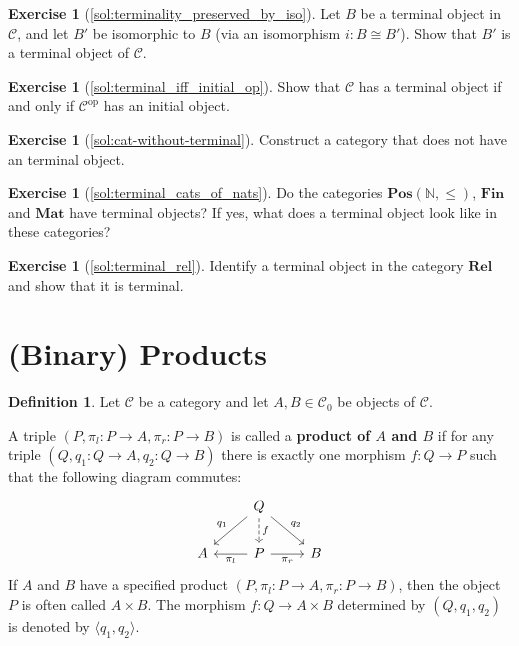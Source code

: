 \documentclass[a4paper,11pt, oneside,titlepage=false]{scrbook}
\theoremstyle{plain}
\theoremstyle{definition}
\newtheorem{dfn}[thm]{Definition}
\newtheorem{exer}[thm]{Exercise}
\newcommand{\Cat}[1]{\mathcal{#1}}
\newcommand{\CC}{\Cat{C}}
\newcommand{\Catb}[1]{\mathbf{#1}}
\newcommand{\POS}{\Catb{Pos}}
\newcommand{\MAT}{\Catb{Mat}}
\newcommand{\SKELFINSET}{\Catb{Fin}}
\newcommand{\REL}{\Catb{Rel}}
\newcommand{\Ob}[1]{{#1}_0}
\newcommand{\op}[1]{\ensuremath{{#1}^\text{op}}}
\newcommand{\projl}{\ensuremath{\pi_l}}
\newcommand{\projr}{\ensuremath{\pi_r}}
\newcommand{\intoproduct}[2]{\ensuremath{\langle #1, #2 \rangle}}
\newcommand{\NN}{\ensuremath{\mathbb{N}}}
\begin{document}
\begin{exer}[\cref{sol:terminality_preserved_by_iso}]\label{exer:terminality_preserved_by_iso}
  Let $B$ be a terminal object in $\CC$, and let $B'$ be isomorphic to $B$ (via an isomorphism $i : B \cong B'$).
  Show that $B'$ is a terminal object of $\CC$.
\end{exer}

\begin{exer}[\cref{sol:terminal_iff_initial_op}]\label{exer:terminal_iff_initial_op}
  Show that $\CC$ has a terminal object if and only if $\op\CC$ has an initial object.
\end{exer}

\begin{exer}[\cref{sol:cat-without-terminal}]\label{exer:cat-without-terminal}
  Construct a category that does not have an terminal object.
\end{exer}

\begin{exer}[\cref{sol:terminal_cats_of_nats}]\label{exer:terminal_cats_of_nats}
  Do the categories $\POS(\NN, \leq)$, $\SKELFINSET$ and $\MAT$ have terminal objects? If yes, what does a terminal object look like in these categories?
\end{exer}

\begin{exer}[\cref{sol:terminal_rel}] \label{exer:terminal_rel}
  Identify a terminal object in the category $\REL$ and show that it is terminal.
\end{exer}

\section{(Binary) Products}
\label{sec:products}



\begin{dfn}\label{def:binproduct}
  Let $\CC$ be a category and let $A,B \in \Ob\CC$ be objects of $\CC$.

  A triple $(P,\projl : P \to A ,\projr : P \to B)$ is called a \textbf{product of $A$ and $B$} if for any triple $(Q,q_1 : Q \to A, q_2 : Q \to B)$ there is exactly one morphism $f : Q \to P$ such that the following diagram commutes:
  \[
    \begin{tikzcd}
      &
      Q \ar[ld, "q_1"'] \ar[rd, "q_2"] \ar[d, dashed, "f"]
      &
      \\
      A
      &
      P \ar[l, "\projl"] \ar[r, "\projr"']
      &
      B
    \end{tikzcd}
  \]
  If $A$ and $B$ have a specified product $(P,\projl : P \to A ,\projr : P \to B)$, then the object $P$ is often called $A \times B$.
  The morphism $f : Q \to A \times B$ determined by $(Q, q_1, q_2)$ is denoted by $\intoproduct { q_1} {q_2}$.
\end{dfn}
\end{document}
